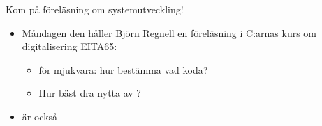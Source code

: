 

\ifkompendium\else
\begin{SlideExtra}{Kom på föreläsning om systemutveckling!}
\begin{itemize}
  \item Måndagen den  håller Björn Regnell en föreläsning i C:arnas kurs om digitalisering EITA65: 
\begin{itemize}
  \item {} för mjukvara: hur bestämma vad koda?
  \item Hur bäst dra nytta av ?
\end{itemize}
  \item {} är också 
\end{itemize}
  
\end{SlideExtra}
\fi 


